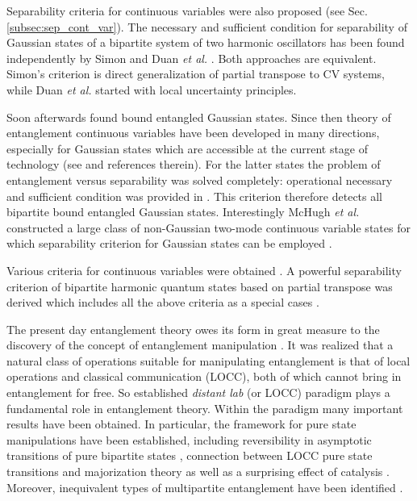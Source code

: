 \documentclass[rmp,12pt,preprint]{revtex4-2}
\begin{document}
Separability criteria for continuous variables were also proposed (see
Sec. \ref{subsec:sep_cont_var}). The necessary and sufficient
condition for separability of Gaussian states of a bipartite system of
two harmonic oscillators has been found independently by Simon and Duan \emph{et al.}
\cite{Simon,DuanGCZ1999-criterion}.
 Both approaches are equivalent. Simon's
criterion is direct generalization of partial transpose to CV systems,
while Duan \emph{et al.} started with local uncertainty principles.

Soon afterwards \cite {WernerWolf} found bound entangled Gaussian
states. Since then theory of entanglement continuous variables have
been developed in many directions, especially for Gaussian states
which are accessible at the current stage of technology (see
\cite{BraunsteinP} and references therein). For the latter states the
problem of entanglement versus separability was solved completely:
operational necessary and sufficient condition was provided in
\cite{GaussianAlgorithm}. This criterion therefore detects all
bipartite bound entangled Gaussian states. Interestingly McHugh \emph{et al.} constructed
a large class of non-Gaussian two-mode continuous variable states for which separability criterion for Gaussian states can be employed \cite {McHughBZ2007}.


Various criteria for continuous variables were obtained \cite
{ManciniGVT2001-criterion,RaymerFSG-cont-var,AgarwalB-cont-var,HilleryZ-cont-var}.
A powerful separability criterion of bipartite harmonic quantum states
based on partial transpose was derived which includes all the above
criteria as a special cases \cite {ShchukinW, MiranowiczP}.

The present day entanglement theory owes its form in great measure to
the discovery of the concept of entanglement manipulation
\cite{Popescu2,BBPSSW1996}. It was realized \cite{BBPSSW1996} that a
natural class of operations suitable for manipulating entanglement is
that of local operations and classical communication (LOCC), both of
which cannot bring in entanglement for free. So established {\it
  distant lab} (or LOCC) paradigm plays a fundamental role in
entanglement theory. Within the paradigm many important results have
been obtained. In particular, the framework for pure state
manipulations have been established, including reversibility in
asymptotic transitions of pure bipartite states \cite{BBPS1996},
connection between LOCC pure state transitions and majorization theory
\cite{SchumacherN-1996-pra} as well as a surprising effect of catalysis
\cite{JonathanP,VidalC,VidalC-irre}. Moreover, inequivalent types of
multipartite entanglement have been identified
\cite{DurVC00-wstate,BPRST-mregs}.
\end{document}
